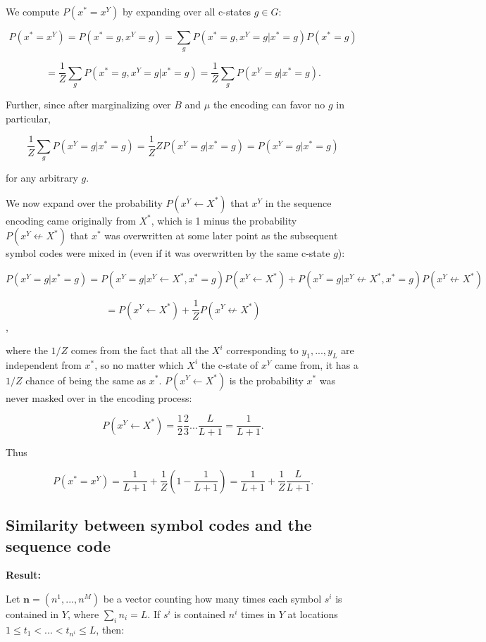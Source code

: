 \documentclass{article}
\begin{document}
We compute $P(x^* = x^Y)$ by expanding over all c-states $g \in G$:

$$P(x^* = x^Y) = P(x^* = g, x^Y = g) = \sum\limits_g P(x^* = g, x^Y = g|x^* = g)P(x^* = g)$$

$$ = \frac{1}{Z}\sum\limits_g P(x^* = g, x^Y = g|x^* = g) = \frac{1}{Z}\sum\limits_g P(x^Y = g|x^* = g).$$

Further, since after marginalizing over $B$ and $\mu$ the encoding can favor no $g$ in particular,

$$\frac{1}{Z}\sum\limits_g P(x^Y = g|x^* = g) = \frac{1}{Z}ZP(x^Y = g|x^* = g) = P(x^Y = g|x^* = g)$$

for any arbitrary $g$.

We now expand over the probability $P(x^Y \leftarrow X^*)$ that $x^Y$ in the sequence encoding came originally from $X^*$, which is 1 minus the probability $P(x^Y \not \leftarrow X^*)$ that $x^*$ was overwritten at some later point as the subsequent symbol codes were mixed in (even if it was overwritten by the same c-state $g$):

$$P(x^Y = g|x^* = g) = P(x^Y = g|x^Y \leftarrow X^*, x^* = g)P(x^Y \leftarrow X^*) + P(x^Y = g|x^Y \not \leftarrow X^*, x^* = g)P(x^Y \not \leftarrow X^*)$$

$$= P(x^Y \leftarrow X^*) + \frac{1}{Z}P(x^Y \not \leftarrow X^*)$$,

where the $1/Z$ comes from the fact that all the $X^i$ corresponding to $y_1, ..., y_L$ are independent from $x^*$, so no matter which $X^i$ the c-state of $x^Y$ came from, it has a $1/Z$ chance of being the same as $x^*$. $P(x^Y \leftarrow X^*)$ is the probability $x^*$ was never masked over in the encoding process:

$$P(x^Y \leftarrow X^*) = \frac{1}{2}\frac{2}{3}...\frac{L}{L+1} = \frac{1}{L+1}.$$

Thus

$$P(x^* = x^Y) = \frac{1}{L+1} + \frac{1}{Z}\left(1 - \frac{1}{L+1}\right) = \frac{1}{L+1} + \frac{1}{Z}\frac{L}{L+1}.$$

\subsection{Similarity between symbol codes and the sequence code}

\textbf{Result:}

Let $\mathbf{n} = (n^1, ..., n^M)$ be a vector counting how many times each symbol $s^i$ is contained in $Y$, where $\sum\limits_i n_i = L.$
If $s^i$ is contained $n^i$ times in $Y$ at locations $1 \leq t_1 <  ... < t_{n^i} \leq L$, then:
\end{document}
